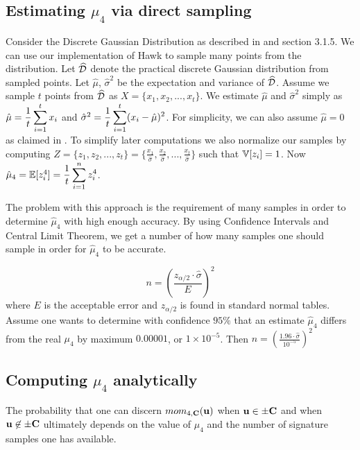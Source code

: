 \subsection{Estimating $\mu_4$ via direct sampling}
Consider the Discrete Gaussian Distribution as described in \cite{HawkSpec24} and section 3.1.5. We can use our implementation of Hawk to sample many points from the distribution.
Let $\widehat{\mathcal{D}}$ denote the practical discrete Gaussian distribution from sampled points.
Let $\hat{\mu}$, $\hat{\sigma}^2$ be the expectation and variance of $\widehat{\mathcal{D}}$.
Assume we sample $t$ points from $\widehat{\mathcal{D}}$ as $X = \{x_1, x_2, ..., x_t\}$. We estimate $\hat{\mu}$ and $\hat{\sigma}^2$ simply as $\hat{\mu} = \mathlarger{\frac{1}{t} \sum_{i=1}^{t} x_i}$ and $\hat{\sigma}^2 = \mathlarger{\frac{1}{t} \sum_{i=1}^{t}(x_i - \hat{\mu})^2}$.
For simplicity, we can also assume $\hat{\mu} = 0$ as claimed in \cite{HawkSpec24}.
To simplify later computations we also normalize our samples by computing $Z = \{z_1, z_2, ..., z_t\} = \{\frac{x_1}{\hat{\sigma}}, \frac{x_2}{\hat{\sigma}},..., \frac{x_t}{\hat{\sigma}}\}$ such that 
$\mathbb{V}[z_i] = 1$.
Now $\hat{\mu}_4 = \bb{E}[z_i^4] = \mathlarger{\frac{1}{t} \sum_{i=1}^{n} z_i ^4}$. 

The problem with this approach is the requirement of many samples in order to determine $\hat{\mu}_4$ with high enough accuracy.
By using Confidence Intervals and Central Limit Theorem, we get a number of how many samples one should sample in order for $\hat{\mu}_4$ to be accurate.

\[
    n = (\frac{z_{\alpha / 2} \cdot \hat{\sigma}}{E} )^2    
\]
where $E$ is the acceptable error and $z_{\alpha / 2}$ is found in standard normal tables.
Assume one wants to determine with confidence $95 \%$ that an estimate $\hat{\mu}_4$ differs from the real $\mu_4$ by maximum $0.00001$, or $1 \times 10^{-5}$.
Then $n = (\frac{1.96 \cdot \hat{\sigma}} {10^{-5}})^2$

\subsection{Computing $\mu_4$ analytically}
The probability that one can discern $mom_{4, \mathbf{C}}(\mathbf{u})$ when $\mathbf{u} \in \pm \mathbf{C}$ and when $\mathbf{u} \not\in \pm \mathbf{C}$ ultimately depends on the value of $\mu_4$ and the number of signature samples one has available.

